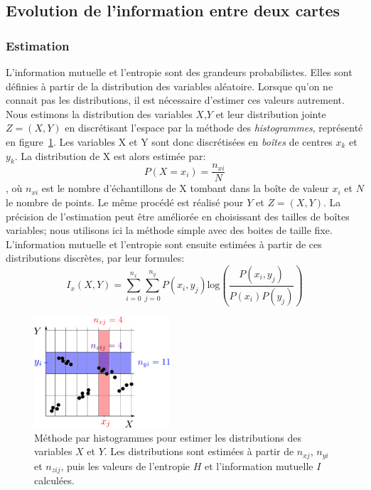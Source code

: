 
\subsection{Evolution de l'information entre deux cartes}

\subsubsection{Estimation}
L'information mutuelle et l'entropie sont des grandeurs probabilistes. Elles sont définies à partir de la distribution des variables aléatoire. Lorsque qu'on ne connait pas les distributions, il est nécessaire d'estimer ces valeurs autrement. 
Nous estimons la distribution des variables $X$,$Y$ et leur distribution jointe $Z = (X,Y)$ en discrétisant l'espace par la méthode des \emph{histogrammes}, représenté en figure~\ref{fig:binning}. Les variables X et Y sont donc discrétisées en \emph{boîtes} de centres $x_k$ et $y_k$. La distribution de X est alors estimée par: 
$$P(X = x_i) = \frac{n_{xi}}{N} $$, où $n_{xi}$ est le nombre d'échantillons de X tombant dans la boîte de valeur $x_i$ et $N$ le nombre de points. Le même procédé est réalisé pour $Y$ et $Z = (X,Y)$. La précision de l'estimation peut être améliorée en choisissant des tailles de boîtes variables; nous utilisons ici la méthode simple avec des boites de taille fixe.
L'information mutuelle et l'entropie sont ensuite estimées à partir de ces distributions discrètes, par leur formules:
\begin{equation}
    I_x(X,Y) = \sum_{i = 0}^{n_x} \sum_{j=0}^{n_y} {P(x_i,y_j)\textrm{log}\left(\frac{P(x_i,y_j)}{P(x_i)P(y_j)}\right)}
   \end{equation}

\begin{figure}
\centering
\includegraphics[width=0.45\textwidth]{boxes}
\caption{Méthode par histogrammes pour estimer les distributions des variables $X$ et $Y$. Les distributions sont estimées à partir de $n_{xj}$, $n_{yi}$ et $n_{zij}$, puis les valeurs de l'entropie $H$ et l'information mutuelle $I$ calculées.}
\label{fig:binning} 

\end{figure}

